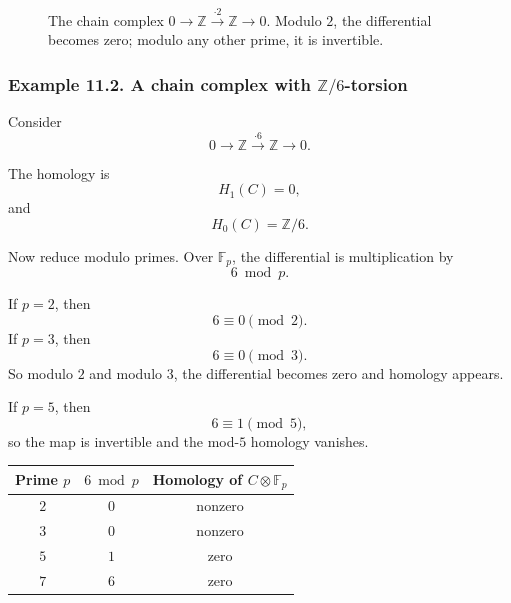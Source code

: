 \documentclass[12pt,a4paper]{article}
\theoremstyle{notespace}
\begin{document}
\begin{figure}[htbp]
	\centering
	\caption{The chain complex \(0\to \mathbb Z \xrightarrow{\cdot 2}\mathbb Z\to 0\). Modulo \(2\), the differential becomes zero; modulo any other prime, it is invertible.}
\end{figure}

\subsubsection*{Example 11.2. A chain complex with \(\mathbb Z/6\)-torsion}

Consider
\[
0
\longrightarrow
\mathbb Z
\xrightarrow{\cdot 6}
\mathbb Z
\longrightarrow
0.
\]

The homology is
\[
H_1(C)=0,
\]
and
\[
H_0(C)=\mathbb Z/6.
\]

Now reduce modulo primes. Over \(\mathbb F_p\), the differential is multiplication by
\[
6\bmod p.
\]

If \(p=2\), then
\[
6\equiv 0\pmod 2.
\]
If \(p=3\), then
\[
6\equiv 0\pmod 3.
\]
So modulo \(2\) and modulo \(3\), the differential becomes zero and homology appears.

If \(p=5\), then
\[
6\equiv 1\pmod 5,
\]
so the map is invertible and the mod-\(5\) homology vanishes.

\begin{center}
	\begin{tabular}{c|c|c}
		\textbf{Prime \(p\)} & \textbf{\(6\bmod p\)} & \textbf{Homology of \(C\otimes \mathbb F_p\)}\\
		\hline
		\(2\) & \(0\) & nonzero\\
		\(3\) & \(0\) & nonzero\\
		\(5\) & \(1\) & zero\\
		\(7\) & \(6\) & zero
	\end{tabular}
\end{center}
\end{document}
